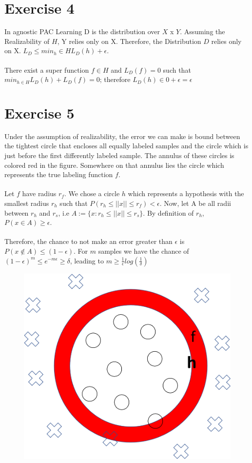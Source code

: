\documentclass[12pt]{article}
\begin{document}
\section *{Exercise 4}
In agnostic PAC Learning D is the distribution over $X$ x $Y$. Assuming the Realizability of $H$, Y relies only on X. Therefore, the Distribution $D$ relies only on X.
$L_D \leq min_h \in H L_D (h) + \epsilon$.
\\ \\
There exist a super function $f \in H$ and $L_D (f) = 0$ such that
$min_{h \in H} L_D (h)+L_D (f) = 0$; therefore
$L_D(h) \in 0+ \epsilon = \epsilon$

\section*{Exercise 5}

Under the assumption of realizability, the error we can make is bound between the tightest circle that encloses all equally labeled samples and the circle which is just before the first differently labeled sample. The annulus of these circles is colored red in the figure. Somewhere on that annulus lies the circle which represents the true labeling function $f$.
\\ \\
Let $f$ have radius $r_f$. We chose a circle $h$ which represents a hypothesis with the smallest radius $r_h$ such that $P(r_h \leq ||x|| \leq r_f) < \epsilon$. Now, let A be all radii between $r_h$ and $r_s$, i.e $A := \{x : r_h \leq ||x|| \leq r_s\}$. By definition of $r_h$, $P(x \in A) \geq \epsilon$.
\\ \\
Therefore, the chance to not make an error greater than $\epsilon$ is $P(x \notin A) \le (1 - \epsilon)$. For $m$ samples we have the chance of $(1-\epsilon)^m \leq e^{-m\epsilon} \geq \delta$, leading to $m \geq \frac{1}{\epsilon} log(\frac{1}{\delta})$


\begin{figure}
	\centering
	\includegraphics[width=0.7\linewidth]{Bild1}
\end{figure}
\end{document}
